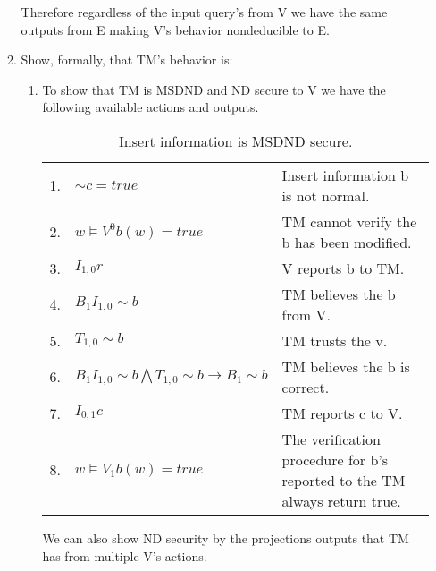 \documentclass[journal,onecolumn]{IEEEtran}
\begin{document}
\begin{enumerate}
\begin{enumerate}
      Therefore regardless of the input query's from V we have the same outputs from E making V's behavior nondeducible to E.

      \item Show, formally, that TM's behavior is:
      
      \begin{enumerate}
        \item To show that TM is MSDND and ND secure to V we have the following available actions and outputs.
        
        \begin{table}[H]
          \caption{Insert information is MSDND secure.}
          \centering
          \begin{tabular}{lll}
          1.  & ${\sim} c = true$                                                         & Insert information b is not normal.                                                       \\
          2.  & $w \vDash V^0 b(w) = true$                                                & TM cannot verify the b has been modified.                                 \\
          3.  & $I_{1,0}r$                                                                & V reports b to TM.                                                \\
          4.  & $B_1I_{1,0} {\sim} b$                                                     & TM believes the b from V.                                     \\
          5.  & $T_{1,0} {\sim} b$                                                        & TM trusts the v.                                                          \\
          6.  & $B_1I_{1,0} {\sim} b \bigwedge T_{1,0} {\sim} b \rightarrow B_1 {\sim} b$ & TM believes the b is correct.                                             \\
          7.  & $I_{0,1}c$                                                                & TM reports c to V.           \\
          8. & $w \vDash V_1 b(w) = true$                                                 & The verification procedure for b's reported to the TM always return true.
          \end{tabular}
        \end{table}

        We can also show ND security by the projections outputs that TM has from multiple V's actions.\\


\end{enumerate}
\end{enumerate}
\end{enumerate}
\end{document}
